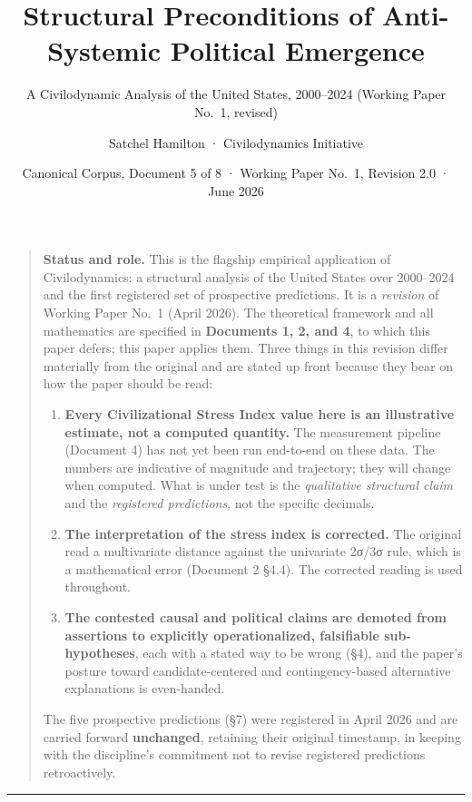 \documentclass[
]{article}
\title{Structural Preconditions of Anti-Systemic Political Emergence}
\subtitle{A Civilodynamic Analysis of the United States, 2000--2024
(Working Paper No.~1, revised)}
\author{Satchel Hamilton · Civilodynamics Initiative}
\date{Canonical Corpus, Document 5 of 8 · Working Paper No.~1, Revision
2.0 · June 2026}
\providecommand{\tightlist}{%
  \setlength{\itemsep}{0pt}\setlength{\parskip}{0pt}}
\begin{document}
\maketitle

\begin{quote}
\textbf{Status and role.} This is the flagship empirical application of
Civilodynamics: a structural analysis of the United States over
2000--2024 and the first registered set of prospective predictions. It
is a \emph{revision} of Working Paper No.~1 (April 2026). The
theoretical framework and all mathematics are specified in
\textbf{Documents 1, 2, and 4}, to which this paper defers; this paper
applies them. Three things in this revision differ materially from the
original and are stated up front because they bear on how the paper
should be read:

\begin{enumerate}
\def\labelenumi{\arabic{enumi}.}
\tightlist
\item
  \textbf{Every Civilizational Stress Index value here is an
  illustrative estimate, not a computed quantity.} The measurement
  pipeline (Document 4) has not yet been run end-to-end on these data.
  The numbers are indicative of magnitude and trajectory; they will
  change when computed. What is under test is the \emph{qualitative
  structural claim} and the \emph{registered predictions}, not the
  specific decimals.
\item
  \textbf{The interpretation of the stress index is corrected.} The
  original read a multivariate distance against the univariate 2σ/3σ
  rule, which is a mathematical error (Document 2 §4.4). The corrected
  reading is used throughout.
\item
  \textbf{The contested causal and political claims are demoted from
  assertions to explicitly operationalized, falsifiable sub-hypotheses},
  each with a stated way to be wrong (§4), and the paper's posture
  toward candidate-centered and contingency-based alternative
  explanations is even-handed.
\end{enumerate}

The five prospective predictions (§7) were registered in April 2026 and
are carried forward \textbf{unchanged}, retaining their original
timestamp, in keeping with the discipline's commitment not to revise
registered predictions retroactively.
\end{quote}

\begin{center}\rule{0.5\linewidth}{0.5pt}\end{center}
\end{document}
